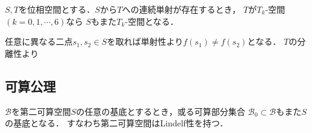 	\begin{screen}
		\begin{thm}[連続な単射の引き戻しによる分離性の遺伝]
			$S,T$を位相空間とする．$S$から$T$への連続単射が存在するとき，
			$T$が$T_k$-空間$(k=0,1,\cdots,6)$なら
			$S$もまた$T_k$-空間となる．
		\end{thm}
	\end{screen}
	
	\begin{prf}
		任意に異なる二点$s_1,s_2 \in S$を取れば単射性より$f(s_1) \neq f(s_2)$となる．
		$T$の分離性より
	\end{prf}
	
\subsection{可算公理}
	\begin{screen}
		\begin{thm}[可算コンパクト性の同値条件]
		\end{thm}
	\end{screen}
	
	\begin{screen}
		\begin{thm}[第二可算空間の任意の基底は可算基を内包する]\label{thm:countable_base_of_second_countable_space}
			$\mathscr{B}$を第二可算空間$S$の任意の基底とするとき，或る可算部分集合
			$\mathscr{B}_0 \subset \mathscr{B}$もまた$S$の基底となる．
			すなわち第二可算空間はLindel\Ddot{o}f性を持つ．
		\end{thm}
	\end{screen}
	
